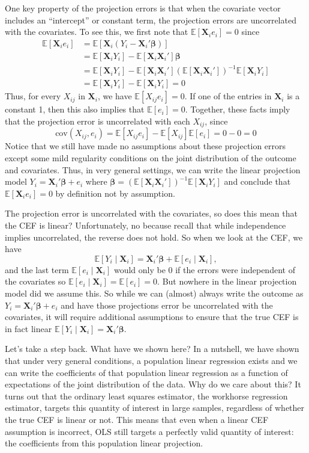 \documentclass[
  letterpaper,
  DIV=11,
  numbers=noendperiod]{scrreprt}
\newcommand{\mb}{\symbf}
\newcommand{\E}{\mathbb{E}}
\newcommand{\cov}{\text{cov}}
\newcommand{\X}{\mb{X}}
\newcommand{\bfbeta}{\mb{\beta}}
\renewcommand{\b}{\symbf{\beta}}
\theoremstyle{definition}
\theoremstyle{plain}
\theoremstyle{definition}
\theoremstyle{remark}
\begin{document}
One key property of the projection errors is that when the covariate
vector includes an ``intercept'' or constant term, the projection errors
are uncorrelated with the covariates. To see this, we first note that
\(\E[\X_{i}e_{i}] = 0\) since \[ 
\begin{aligned}
  \E[\X_{i}e_{i}] &= \E[\X_{{i}}(Y_{i} - \X_{i}'\bfbeta)] \\
                  &= \E[\X_{i}Y_{i}] - \E[\X_{i}\X_{i}']\bfbeta \\
                  &= \E[\X_{i}Y_{i}] - \E[\X_{i}\X_{i}']\left(\E[\X_{i}\X_{i}']\right)^{-1}\E[\X_{i}Y_{i}] \\
  &= \E[\X_{i}Y_{i}] - \E[\X_{i}Y_{i}] = 0
\end{aligned}
\] Thus, for every \(X_{ij}\) in \(\X_{i}\), we have
\(\E[X_{ij}e_{i}] =0\). If one of the entries in \(\X_i\) is a constant
1, then this also implies that \(\E[e_{i}] =0\). Together, these facts
imply that the projection error is uncorrelated with each \(X_{ij}\),
since \[ 
\cov(X_{ij}, e_{i}) = \E[X_{ij}e_{i}] - \E[X_{ij}]\E[e_{i}] = 0 - 0 = 0
\] Notice that we still have made no assumptions about these projection
errors except some mild regularity conditions on the joint distribution
of the outcome and covariates. Thus, in very general settings, we can
write the linear projection model \(Y_i = \X_i'\bfbeta + e_i\) where
\(\bfbeta = \left(\E[\X_{i}\X_{i}']\right)^{-1}\E[\X_{i}Y_{i}]\) and
conclude that \(\E[\X_{i}e_{i}] = 0\) by definition not by assumption.

The projection error is uncorrelated with the covariates, so does this
mean that the CEF is linear? Unfortunately, no because recall that while
independence implies uncorrelated, the reverse does not hold. So when we
look at the CEF, we have \[ 
\E[Y_{i} \mid \X_{i}] = \X_{i}'\bfbeta + \E[e_{i} \mid \X_{i}],
\] and the last term \(\E[e_{i} \mid \X_{i}]\) would only be 0 if the
errors were independent of the covariates so
\(\E[e_{i} \mid \X_{i}] = \E[e_{i}] = 0\). But nowhere in the linear
projection model did we assume this. So while we can (almost) always
write the outcome as \(Y_i = \X_i'\bfbeta + e_i\) and have those
projections error be uncorrelated with the covariates, it will require
additional assumptions to ensure that the true CEF is in fact linear
\(\E[Y_{i} \mid \X_{i}] = \X_{i}'\b\).

Let's take a step back. What have we shown here? In a nutshell, we have
shown that under very general conditions, a population linear regression
exists and we can write the coefficients of that population linear
regression as a function of expectations of the joint distribution of
the data. Why do we care about this? It turns out that the ordinary
least squares estimator, the workhorse regression estimator, targets
this quantity of interest in large samples, regardless of whether the
true CEF is linear or not. This means that even when a linear CEF
assumption is incorrect, OLS still targets a perfectly valid quantity of
interest: the coefficients from this population linear projection.
\end{document}
